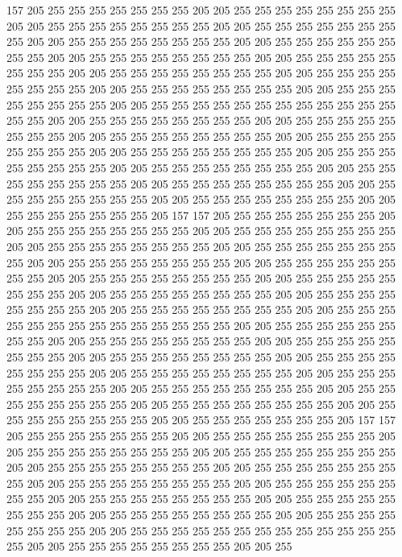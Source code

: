 157 205 255 255 255 255 255 255 255 205 205 255 255 255 255 255 255 255 255 205
205 255 255 255 255 255 255 255 255 205 205 255 255 255 255 255 255 255 255 205
205 255 255 255 255 255 255 255 255 205 205 255 255 255 255 255 255 255 255 205
205 255 255 255 255 255 255 255 255 205 205 255 255 255 255 255 255 255 255 205
205 255 255 255 255 255 255 255 255 205 205 255 255 255 255 255 255 255 255 205
205 255 255 255 255 255 255 255 255 205 205 255 255 255 255 255 255 255 255 205
205 255 255 255 255 255 255 255 255 255 255 255 255 255 255 205 205 255 255 255
255 255 255 255 255 205 205 255 255 255 255 255 255 255 255 205 205 255 255 255
255 255 255 255 255 205 205 255 255 255 255 255 255 255 255 205 205 255 255 255
255 255 255 255 255 205 205 255 255 255 255 255 255 255 255 205 205 255 255 255
255 255 255 255 255 205 205 255 255 255 255 255 255 255 255 205 205 255 255 255
255 255 255 255 255 205 205 255 255 255 255 255 255 255 255 205 205 255 255 255
255 255 255 255 255 205 205 255 255 255 255 255 255 255 205 157 157 205 255 255
255 255 255 255 255 205 205 255 255 255 255 255 255 255 255 205 205 255 255 255
255 255 255 255 255 205 205 255 255 255 255 255 255 255 255 205 205 255 255 255
255 255 255 255 255 205 205 255 255 255 255 255 255 255 255 205 205 255 255 255
255 255 255 255 255 205 205 255 255 255 255 255 255 255 255 205 205 255 255 255
255 255 255 255 255 205 205 255 255 255 255 255 255 255 255 205 205 255 255 255
255 255 255 255 255 205 205 255 255 255 255 255 255 255 255 205 205 255 255 255
255 255 255 255 255 255 255 255 255 255 255 205 205 255 255 255 255 255 255 255
255 205 205 255 255 255 255 255 255 255 255 205 205 255 255 255 255 255 255 255
255 205 205 255 255 255 255 255 255 255 255 205 205 255 255 255 255 255 255 255
255 205 205 255 255 255 255 255 255 255 255 205 205 255 255 255 255 255 255 255
255 205 205 255 255 255 255 255 255 255 255 205 205 255 255 255 255 255 255 255
255 205 205 255 255 255 255 255 255 255 255 205 205 255 255 255 255 255 255 255
255 205 205 255 255 255 255 255 255 255 205 157 157 205 255 255 255 255 255 255
255 205 205 255 255 255 255 255 255 255 255 205 205 255 255 255 255 255 255 255
255 205 205 255 255 255 255 255 255 255 255 205 205 255 255 255 255 255 255 255
255 205 205 255 255 255 255 255 255 255 255 205 205 255 255 255 255 255 255 255
255 205 205 255 255 255 255 255 255 255 255 205 205 255 255 255 255 255 255 255
255 205 205 255 255 255 255 255 255 255 255 205 205 255 255 255 255 255 255 255
255 205 205 255 255 255 255 255 255 255 255 205 205 255 255 255 255 255 255 255
255 255 255 255 255 255 255 205 205 255 255 255 255 255 255 255 255 205 205 255

